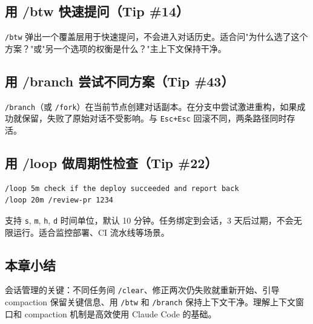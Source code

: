 \subsection{用 /btw 快速提问（Tip \#14）}

\texttt{/btw} 弹出一个覆盖层用于快速提问，不会进入对话历史。适合问"为什么选了这个方案？"或"另一个选项的权衡是什么？"主上下文保持干净。

\subsection{用 /branch 尝试不同方案（Tip \#43）}

\texttt{/branch}（或 \texttt{/fork}）在当前节点创建对话副本。在分支中尝试激进重构，如果成功就保留，失败了原始对话不受影响。与 \texttt{Esc+Esc} 回滚不同，两条路径同时存活。

\subsection{用 /loop 做周期性检查（Tip \#22）}

\begin{lstlisting}[caption={/loop 示例}, language=bash]
/loop 5m check if the deploy succeeded and report back
/loop 20m /review-pr 1234
\end{lstlisting}

支持 \texttt{s}, \texttt{m}, \texttt{h}, \texttt{d} 时间单位，默认 10 分钟。任务绑定到会话，3 天后过期，不会无限运行。适合监控部署、CI 流水线等场景。

\subsection{本章小结}

会话管理的关键：不同任务间 \texttt{/clear}、修正两次仍失败就重新开始、引导 compaction 保留关键信息、用 \texttt{/btw} 和 \texttt{/branch} 保持上下文干净。理解上下文窗口和 compaction 机制是高效使用 Claude Code 的基础。


